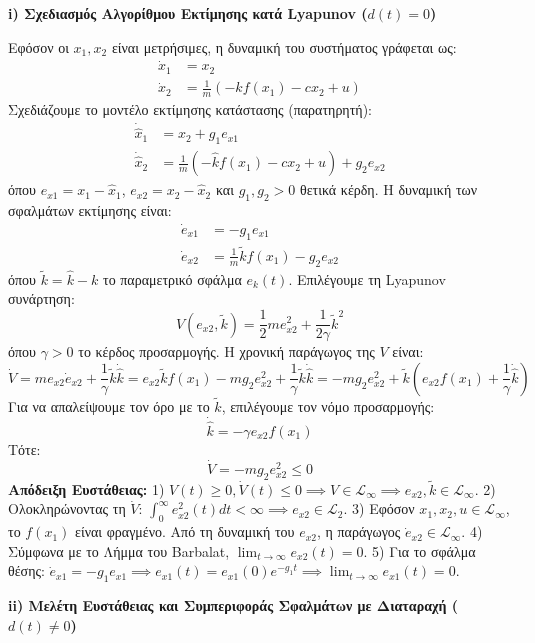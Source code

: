 \documentclass[a4paper,11pt]{article}
\begin{document}
\begin{answer}
\textbf{i) Σχεδιασμός Αλγορίθμου Εκτίμησης κατά Lyapunov ($d(t) = 0$)}

Εφόσον οι $x_1, x_2$ είναι μετρήσιμες, η δυναμική του συστήματος γράφεται ως:
\begin{align*}
    \dot{x}_1 &= x_2 \\
    \dot{x}_2 &= \frac{1}{m} \left( -k f(x_1) - c x_2 + u \right)
\end{align*}
Σχεδιάζουμε το μοντέλο εκτίμησης κατάστασης (παρατηρητή):
\begin{align*}
    \dot{\hat{x}}_1 &= x_2 + g_1 e_{x1} \\
    \dot{\hat{x}}_2 &= \frac{1}{m} \left( -\hat{k} f(x_1) - c x_2 + u \right) + g_2 e_{x2}
\end{align*}
όπου $e_{x1} = x_1 - \hat{x}_1$, $e_{x2} = x_2 - \hat{x}_2$ και $g_1, g_2 > 0$ θετικά κέρδη.
Η δυναμική των σφαλμάτων εκτίμησης είναι:
\begin{align*}
    \dot{e}_{x1} &= -g_1 e_{x1} \\
    \dot{e}_{x2} &= \frac{1}{m} \tilde{k} f(x_1) - g_2 e_{x2}
\end{align*}
όπου $\tilde{k} = \hat{k} - k$ το παραμετρικό σφάλμα $e_k(t)$.
Επιλέγουμε τη Lyapunov συνάρτηση:
\[ V(e_{x2}, \tilde{k}) = \frac{1}{2} m e_{x2}^2 + \frac{1}{2\gamma} \tilde{k}^2 \]
όπου $\gamma > 0$ το κέρδος προσαρμογής. Η χρονική παράγωγος της $V$ είναι:
\[ \dot{V} = m e_{x2} \dot{e}_{x2} + \frac{1}{\gamma} \tilde{k} \dot{\hat{k}} = e_{x2} \tilde{k} f(x_1) - m g_2 e_{x2}^2 + \frac{1}{\gamma} \tilde{k} \dot{\hat{k}} = -m g_2 e_{x2}^2 + \tilde{k} \left( e_{x2} f(x_1) + \frac{1}{\gamma} \dot{\hat{k}} \right) \]
Για να απαλείψουμε τον όρο με το $\tilde{k}$, επιλέγουμε τον νόμο προσαρμογής:
\[ \dot{\hat{k}} = -\gamma e_{x2} f(x_1) \]
Τότε:
\[ \dot{V} = -m g_2 e_{x2}^2 \le 0 \]
\textbf{Απόδειξη Ευστάθειας:}
1) $V(t) \ge 0, \dot{V}(t) \le 0 \implies V \in \mathcal{L}_\infty \implies e_{x2}, \tilde{k} \in \mathcal{L}_\infty$.
2) Ολοκληρώνοντας τη $\dot{V}$: $\int_0^\infty e_{x2}^2(t) dt < \infty \implies e_{x2} \in \mathcal{L}_2$.
3) Εφόσον $x_1, x_2, u \in \mathcal{L}_\infty$, το $f(x_1)$ είναι φραγμένο. Από τη δυναμική του $e_{x2}$, η παράγωγος $\dot{e}_{x2} \in \mathcal{L}_\infty$.
4) Σύμφωνα με το Λήμμα του Barbalat, $\lim_{t \to \infty} e_{x2}(t) = 0$.
5) Για το σφάλμα θέσης: $\dot{e}_{x1} = -g_1 e_{x1} \implies e_{x1}(t) = e_{x1}(0) e^{-g_1 t} \implies \lim_{t \to \infty} e_{x1}(t) = 0$.

\textbf{ii) Μελέτη Ευστάθειας και Συμπεριφοράς Σφαλμάτων με Διαταραχή ($d(t) \ne 0$)}


\end{answer}
\end{document}
